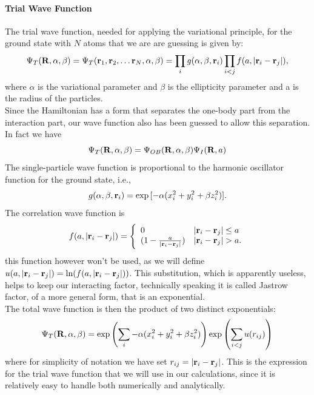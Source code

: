 \documentclass[10pt,a4paper,titlepage]{article}
\begin{document}
\paragraph*{Trial Wave Function}  The trial wave function, needed for applying the variational principle, for the ground state with $N$ atoms that we are are guessing is given by:
 \begin{equation}
 \Psi_T({\bf R}, \alpha, \beta)=\Psi_T({\bf r}_1, {\bf r}_2, \dots {\bf r}_N,\alpha,\beta)=\prod_i g(\alpha,\beta,{\bf r}_i)\prod_{i<j}f(a,|{\bf r}_i-{\bf r}_j|),
 \label{eq:trialwf}
 \end{equation}
 where $\alpha$ is the variational parameter and $\beta$ is the ellipticity parameter and a is the radius of the particles.  \\
 Since the Hamiltonian has a form that separates the one-body part from the interaction part, our wave function also has been guessed to allow this separation. In fact we have  
  \begin{equation}
   \Psi_T({\bf R}, \alpha, \beta) =    \Psi_{OB}({\bf R}, \alpha, \beta)  \Psi_{I}({\bf R}, a)
   \end{equation}
   The  single-particle wave function is proportional to the harmonic oscillator function for the ground state, i.e.,
 \begin{equation}
    g(\alpha,\beta,{\bf r}_i)= \exp{[-\alpha(x_i^2+y_i^2+\beta z_i^2)]}.
 \end{equation}
The correlation wave function is
 \begin{equation}
    f(a,|{\bf r}_i-{\bf r}_j|)=\Bigg\{
 \begin{array}{ll}
	 0 & {|{\bf r}_i-{\bf r}_j|} \leq {a}\\
	 (1-\frac{a}{|{\bf r}_i-{\bf r}_j|}) & {|{\bf r}_i-{\bf r}_j|} > {a}.
 \end{array}
 \end{equation}  
 this function however won't be used, as we will define $u(a,|{\bf r}_i-{\bf r}_j|) = \ln (f (a,|{\bf r}_i-{\bf r}_j|))$. This substitution, which is apparently useless, helps to keep our interacting factor, technically speaking it is called Jastrow factor, of a more general form, that is an exponential. \\
 The total wave function is then the product of two distinct exponentials:
  \begin{equation}
 \Psi_T({\bf R}, \alpha, \beta)=\exp{\left(\sum_{i}-\alpha(x_i^2+y_i^2+\beta z_i^2)\right)}\exp{\left(\sum_{i<j}u(r_{ij})\right)}
 \label{eq:trialwf1}
 \end{equation}
 where for simplicity of notation we have set $r_{ij} = |{\bf r}_i-{\bf r}_j|$. This is the expression for the trial wave function that we will use in our calculations, since it is relatively easy to handle both numerically and analytically.
 
\end{document}

